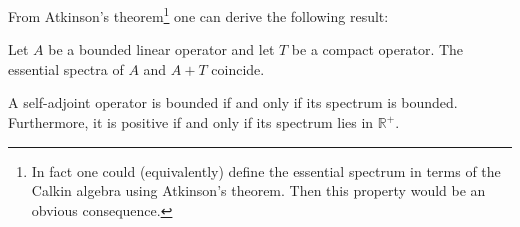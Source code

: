     From Atkinson's theorem\footnote{In fact one could (equivalently) define the essential spectrum in terms of the Calkin algebra using Atkinson's theorem. Then this property would be an obvious consequence.} one can derive the following result:
    \begin{property}
        Let $A$ be a bounded linear operator and let $T$ be a compact operator. The essential spectra of $A$ and $A+T$ coincide.
    \end{property}

    \begin{property}
        A self-adjoint operator is bounded if and only if its spectrum is bounded. Furthermore, it is positive if and only if its spectrum lies in $\mathbb{R}^+$.
    \end{property}